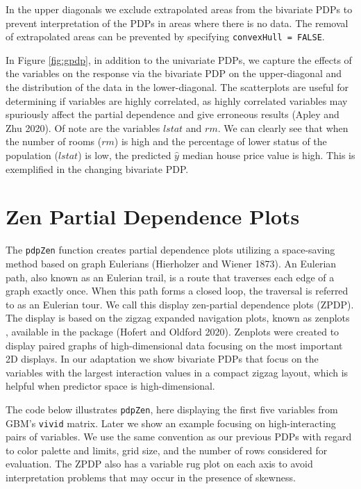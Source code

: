 In the upper diagonals we exclude extrapolated areas from the bivariate PDPs to prevent interpretation of the PDPs in areas where there is no data. The removal of extrapolated areas can be prevented by specifying \texttt{convexHull\ =\ FALSE}.

In Figure \ref{fig:gpdp}, in addition to the univariate PDPs, we capture the effects of the variables on the response via the bivariate PDP on the upper-diagonal and the distribution of the data in the lower-diagonal. The scatterplots are useful for determining if variables are highly correlated, as highly correlated variables may spuriously affect the partial dependence and give erroneous results (Apley and Zhu 2020). Of note are the variables \(lstat\) and \(rm\). We can clearly see that when the number of rooms (\(rm\)) is high and the percentage of lower status of the population (\(lstat\)) is low, the predicted \(\hat{y}\) median house price value is high. This is exemplified in the changing bivariate PDP.

\hypertarget{sec:ZPDP}{%
\section{Zen Partial Dependence Plots}\label{sec:ZPDP}}

The \texttt{pdpZen} function creates partial dependence plots utilizing a space-saving method based on graph Eulerians (Hierholzer and Wiener 1873). An Eulerian path, also known as an Eulerian trail, is a route that traverses each edge of a graph exactly once. When this path forms a closed loop, the traversal is referred to as an Eulerian tour. We call this display zen-partial dependence plots (ZPDP). The display is based on the zigzag expanded navigation plots, known as zenplots , available in the  package (Hofert and Oldford 2020). Zenplots were created to display paired graphs of high-dimensional data focusing on the most important 2D displays.
In our adaptation we show bivariate PDPs that focus on the variables with the largest interaction values in a compact zigzag layout, which is helpful when predictor space is high-dimensional.

The code below illustrates \texttt{pdpZen}, here displaying the first five variables from GBM's \texttt{vivid} matrix. Later we show an example focusing on high-interacting pairs of variables.
We use the same convention as our previous PDPs with regard to color palette and limits, grid size, and the number of rows considered for evaluation. The ZPDP also has a variable rug plot on each axis to avoid interpretation problems that may occur in the presence of skewness.

